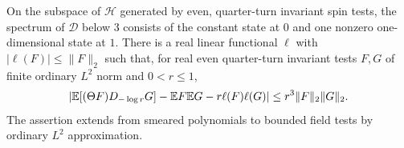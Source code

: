 \begin{proposition}\label{prop:radial-gap}
On the subspace of $\mathcal H$ generated by even, quarter-turn
invariant spin tests, the spectrum of $\mathcal D$ below $3$ consists
of the constant state at $0$ and one nonzero one-dimensional state at
$1$.  There is a real linear functional $\ell$ with
$|\ell(F)|\leq\|F\|_2$ such that, for real even quarter-turn
invariant tests $F,G$ of finite ordinary $L^2$ norm and $0<r\leq1$,
\begin{equation}
 \left|\mathbb E[(\Theta F)D_{-\log r}G]
       -\mathbb E F\mathbb E G-r\ell(F)\ell(G)\right|
 \leq r^3\|F\|_2\|G\|_2.
 \label{eq:transfer-radial-gap}
\end{equation}
The assertion extends from smeared polynomials to bounded field tests
by ordinary $L^2$ approximation.
\end{proposition}

